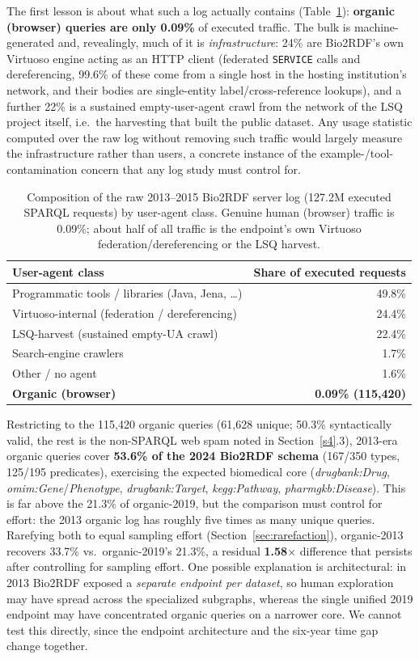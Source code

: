 \documentclass[sw]{iosart2x}
\begin{document}
The first lesson is about what such a log actually contains (Table~\ref{tab:bio2013comp}): \textbf{organic (browser) queries are only 0.09\%} of executed traffic. The bulk is machine-generated and, revealingly, much of it is \emph{infrastructure}: 24\% are Bio2RDF's own Virtuoso engine acting as an HTTP client (federated \texttt{SERVICE} calls and dereferencing, 99.6\% of these come from a single host in the hosting institution's network, and their bodies are single-entity label/cross-reference lookups), and a further 22\% is a sustained empty-user-agent crawl from the network of the LSQ project itself, i.e.\ the harvesting that built the public dataset. Any usage statistic computed over the raw log without removing such traffic would largely measure the infrastructure rather than users, a concrete instance of the example-/tool-contamination concern that any log study must control for.

\begin{table}[ht]
\centering
\caption{Composition of the raw 2013--2015 Bio2RDF server log (127.2M executed SPARQL requests) by user-agent class. Genuine human (browser) traffic is 0.09\%; about half of all traffic is the endpoint's own Virtuoso federation/dereferencing or the LSQ harvest.}
\label{tab:bio2013comp}
\begin{tabular}{l|r}
\hline
User-agent class & Share of executed requests \\
\hline
Programmatic tools / libraries (Java, Jena, \ldots) & 49.8\% \\
Virtuoso-internal (federation / dereferencing) & 24.4\% \\
LSQ-harvest (sustained empty-UA crawl) & 22.4\% \\
Search-engine crawlers & 1.7\% \\
Other / no agent & 1.6\% \\
\textbf{Organic (browser)} & \textbf{0.09\% (115{,}420)} \\
\hline
\end{tabular}
\end{table}

Restricting to the 115{,}420 organic queries (61{,}628 unique; 50.3\% syntactically valid, the rest is the non-SPARQL web spam noted in Section~\ref{s4}.3), 2013-era organic queries cover \textbf{53.6\% of the 2024 Bio2RDF schema} (167/350 types, 125/195 predicates), exercising the expected biomedical core (\emph{drugbank:Drug}, \emph{omim:Gene}/\emph{Phenotype}, \emph{drugbank:Target}, \emph{kegg:Pathway}, \emph{pharmgkb:Disease}). This is far above the 21.3\% of organic-2019, but the comparison must control for effort: the 2013 organic log has roughly five times as many unique queries. Rarefying both to equal sampling effort (Section~\ref{sec:rarefaction}), organic-2013 recovers 33.7\% vs.\ organic-2019's 21.3\%, a residual \textbf{1.58$\times$} difference that persists after controlling for sampling effort. One possible explanation is architectural: in 2013 Bio2RDF exposed a \emph{separate endpoint per dataset}, so human exploration may have spread across the specialized subgraphs, whereas the single unified 2019 endpoint may have concentrated organic queries on a narrower core. We cannot test this directly, since the endpoint architecture and the six-year time gap change together.
\end{document}
